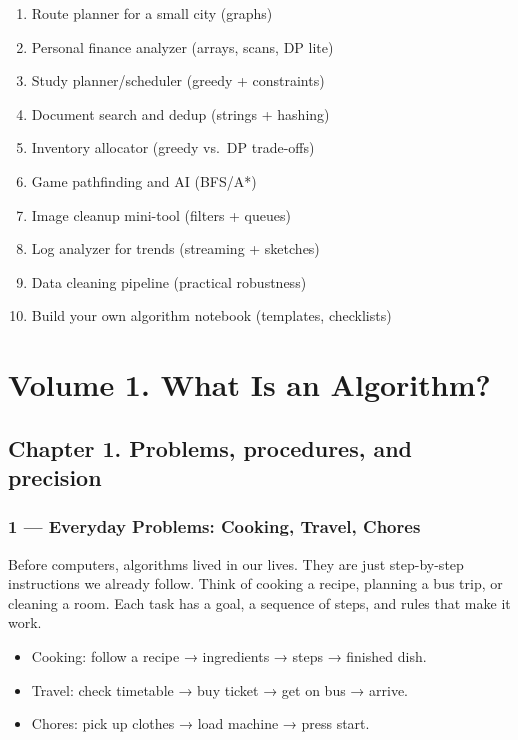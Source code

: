 \documentclass[
  letterpaper,
  DIV=11,
  numbers=noendperiod]{scrreprt}
\providecommand{\tightlist}{%
  \setlength{\itemsep}{0pt}\setlength{\parskip}{0pt}}
\begin{document}
\begin{enumerate}
\def\labelenumi{\arabic{enumi}.}
\setcounter{enumi}{190}
\tightlist
\item
  Route planner for a small city (graphs)
\item
  Personal finance analyzer (arrays, scans, DP lite)
\item
  Study planner/scheduler (greedy + constraints)
\item
  Document search and dedup (strings + hashing)
\item
  Inventory allocator (greedy vs.~DP trade-offs)
\item
  Game pathfinding and AI (BFS/A*)
\item
  Image cleanup mini-tool (filters + queues)
\item
  Log analyzer for trends (streaming + sketches)
\item
  Data cleaning pipeline (practical robustness)
\item
  Build your own algorithm notebook (templates, checklists)
\end{enumerate}


\chapter{Volume 1. What Is an
Algorithm?}\label{volume-1.-what-is-an-algorithm}

\section{Chapter 1. Problems, procedures, and
precision}\label{chapter-1.-problems-procedures-and-precision}

\subsection{1 --- Everyday Problems: Cooking, Travel,
Chores}\label{everyday-problems-cooking-travel-chores}

Before computers, algorithms lived in our lives. They are just
step-by-step instructions we already follow. Think of cooking a recipe,
planning a bus trip, or cleaning a room. Each task has a goal, a
sequence of steps, and rules that make it work.

\begin{itemize}
\tightlist
\item
  Cooking: follow a recipe → ingredients → steps → finished dish.
\item
  Travel: check timetable → buy ticket → get on bus → arrive.
\item
  Chores: pick up clothes → load machine → press start.
\end{itemize}
\end{document}
